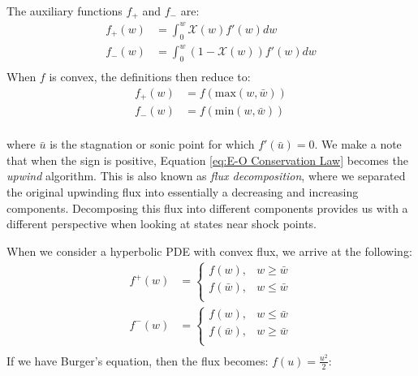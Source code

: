 \documentclass[a4paper]{article}
\numberwithin{equation}{section}
\begin{document}
The auxiliary functions $f_+$ and $f_-$ are:
\begin{equation}
    \begin{split}
        f_+ (w) &= \int_0^w \mathcal{X} (w) f'(w) dw\\
        f_- (w) &= \int_0^w (1 - \mathcal{X}(w)) f'(w)dw\\
    \end{split}
\end{equation}
When $f$ is convex, the definitions then reduce to:
\begin{equation}
    \begin{split}
        f_+ (w) &= f(\mathrm{max}(w,\bar{w}))\\
        f_- (w) &= f(\mathrm{min}(w,\bar{w})) \\
    \end{split}
\end{equation}

where $\bar{u}$ is the stagnation or sonic point for which $f'(\bar{u}) = 0$. We make a note that when the sign is positive, Equation \ref{eq:E-O Conservation Law} becomes the \textit{upwind} algorithm. This is also known as \textit{flux decomposition}, where we separated the original upwinding flux into essentially a decreasing and increasing components. Decomposing this flux into different components provides us with a different perspective when looking at states near shock points.

When we consider a hyperbolic PDE with convex flux, we arrive at the following:
\begin{equation}
    \begin{split}
        f^+ (w) &= 
        \begin{cases}
            f(w), & w \geq \bar{w}\\
            f(\bar{w}), & w \leq \bar{w}\\
        \end{cases}\\
        f^-(w) &= 
        \begin{cases}
            f(w), & w \leq \bar{w} \\
            f(\bar{w}), & w \geq \bar{w}\\
        \end{cases}\\
    \end{split}
\end{equation}
If we have Burger's equation, then the flux becomes: $f(u) = \frac{u^2}{2}$:
\end{document}
